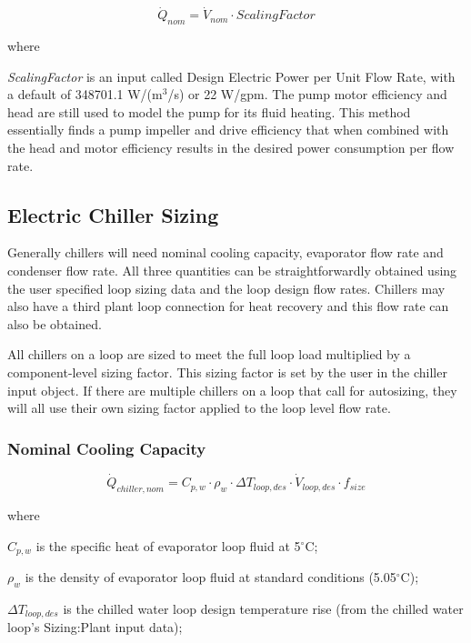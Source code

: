 \begin{equation}
\dot Q_{nom} = \dot V_{nom} \cdot ScalingFactor
\end{equation}

where

\emph{ScalingFactor} is an input called Design Electric Power per Unit Flow Rate, with a default of 348701.1 W/(m\(^{3}\)/s) or 22 W/gpm. The pump motor efficiency and head are still used to model the pump for its fluid heating. This method essentially finds a pump impeller and drive efficiency that when combined with the head and motor efficiency results in the desired power consumption per flow rate.

\subsection{Electric Chiller Sizing}\label{electric-chiller-sizing}

Generally chillers will need nominal cooling capacity, evaporator flow rate and condenser flow rate. All three quantities can be straightforwardly obtained using the user specified loop sizing data and the loop design flow rates.  Chillers may also have a third plant loop connection for heat recovery and this flow rate can also be obtained.

All chillers on a loop are sized to meet the full loop load multiplied by a component-level sizing factor.  This sizing factor is set by the user in the chiller input object. If there are multiple chillers on a loop that call for autosizing, they will all use their own sizing factor applied to the loop level flow rate.

\subsubsection{Nominal Cooling Capacity}\label{nominal-cooling-capacity}

\begin{equation}
\dot Q_{chiller,nom} = C_{p,w} \cdot \rho_w \cdot \Delta T_{loop,des} \cdot \dot V_{loop,des} \cdot f_{size}
\end{equation}

where

\( C_{p,w} \) is the specific heat of evaporator loop fluid at 5\(^{\circ}\)C;

\( \rho_w \) is the density of evaporator loop fluid at standard conditions (5.05\(^{\circ}\)C);

\( \Delta T_{loop,des} \) is the chilled water loop design temperature rise (from the chilled water loop's Sizing:Plant input data);

